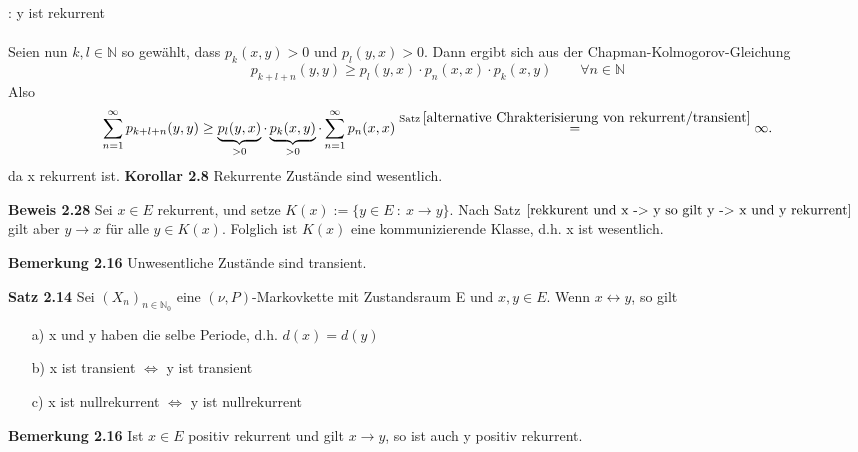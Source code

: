 \noindent
{}: y ist rekurrent
\\
\\
Seien nun $k,l \in \mathbb{N}$ so gewählt, dass $p_{k}(x,y) > 0$ und $p_{l}(y,x) > 0$. Dann ergibt sich aus der Chapman-Kolmogorov-Gleichung
\begin{equation*}
 p_{k+l+n}(y,y) \geq p_{l}(y,x) \cdot p_{n}(x,x) \cdot p_{k}(x,y) \qquad \forall n \in \mathbb{N}
\end{equation*} 
Also
\begin{equation*}
\sum_{n=1}^{\infty} p_{k+l+n}(y,y) \geq \underbrace{p_{l}(y,x)}_{>0} \cdot \underbrace{p_{k}(x,y)}_{>0} \cdot \sum_{n=1}^{\infty} p_{n}(x,x) \stackrel{\mathrm{Satz} \: \ref{alternative Chrakterisierung von rekurrent/transient}}{=} \infty.
\end{equation*}
da x rekurrent ist.
\textbf{Korollar 2.8} 
Rekurrente Zustände sind wesentlich.

\textbf{Beweis 2.28}
Sei $x \in E$ rekurrent, und setze $K(x) := \lbrace y \in E \: : \: x \rightarrow y \rbrace$. Nach Satz $\ref{rekkurent und x -> y so gilt y -> x und y rekurrent}$ gilt aber $y \rightarrow x$ für alle $y \in K(x)$. Folglich ist $K(x)$ eine kommunizierende Klasse, d.h. x ist wesentlich.
 
\textbf{Bemerkung 2.16}
Unwesentliche Zustände sind transient.

\textbf{Satz 2.14}
\label{x und y selbe Periode, x transient y auch x nullrekurrent y auch}
Sei $(X_{n})_{n \in \mathbb{N}_{0}}$ eine $(\nu,P)$-Markovkette mit Zustandsraum E und $x,y \in E$. Wenn $x \leftrightarrow y$, so gilt
\begin{itemize}
\item[a)] x und y haben die selbe Periode, d.h. $d(x) = d(y)$ 
\item[b)] x ist transient $\Leftrightarrow$ y ist transient
\item[c)] x ist nullrekurrent $\Leftrightarrow$ y ist nullrekurrent
\end{itemize}

\textbf{Bemerkung 2.16}
\label{Bemerkung 16}
Ist $x \in E$ positiv rekurrent und gilt $x \rightarrow y$, so ist auch y positiv rekurrent.

